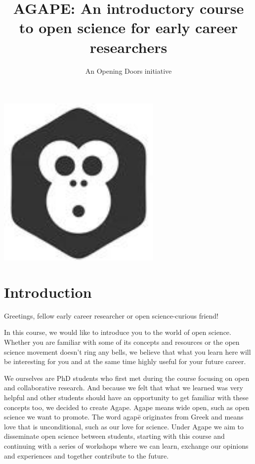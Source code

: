\documentclass[
]{book}
\title{AGAPE: An introductory course to open science for early career researchers}
\author{An Opening Doors initiative}
\date{}
\begin{document}
\maketitle

{
\setcounter{tocdepth}{1}
\tableofcontents
}
\includegraphics[width=0.6\textwidth,height=\textheight]{images/agapecover.png}

\hypertarget{introduction}{%
\chapter*{Introduction}\label{introduction}}

Greetings, fellow early career researcher or open science-curious friend!

In this course, we would like to introduce you to the world of open science. Whether you are familiar with some of its concepts and resources or the open science movement doesn't ring any bells, we believe that what you learn here will be interesting for you and at the same time highly useful for your future career.

We ourselves are PhD students who first met during the course focusing on open and collaborative research. And because we felt that what we learned was very helpful and other students should have an opportunity to get familiar with these concepts too, we decided to create Agape. Agape means wide open, such as open science we want to promote. The word agapē originates from Greek and means love that is unconditional, such as our love for science. Under Agape we aim to disseminate open science between students, starting with this course and continuing with a series of workshops where we can learn, exchange our opinions and experiences and together contribute to the future.
\end{document}
